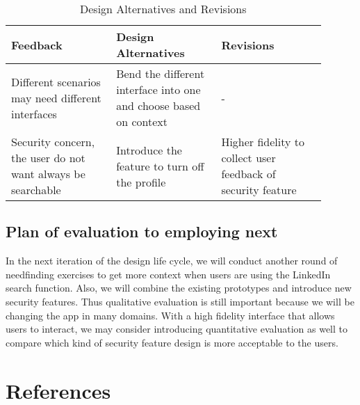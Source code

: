 \documentclass[
	letterpaper, %
]{jdf}
\begin{document}
\begin{table}[h] %
	\caption{Design Alternatives and Revisions}
	\small %
	\centering %
	\begin{tabular}{L{0.3\linewidth} L{0.3\linewidth} L{0.3\linewidth}}
		\textbf{Feedback} & \textbf{Design Alternatives} & \textbf{Revisions} \\
		\toprule[0.5pt]
		Different scenarios may need different interfaces & Bend the different interface into one and choose based on context & - \\
		\midrule
		Security concern, the user do not want always be searchable & Introduce the feature to turn off the profile & Higher fidelity to collect user feedback of security feature \\
	\end{tabular}
\end{table}

\subsection{Plan of evaluation to employing next}
In the next iteration of the design life cycle, we will conduct another round of needfinding exercises to get more context when users are using the LinkedIn search function. Also, we will combine the existing prototypes and introduce new security features. Thus qualitative evaluation is still important because we will be changing the app in many domains. With a high fidelity interface that allows users to interact, we may consider introducing quantitative evaluation as well to compare which kind of security feature design is more acceptable to the users.


\section{References}
\printbibliography[heading=none]
\end{document}
